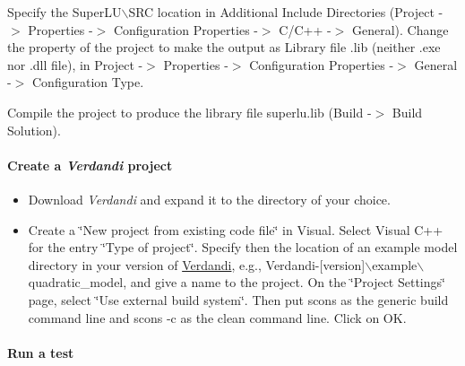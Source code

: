 \documentclass{tufte-book}
\begin{document}
\begin{itemize}
\-Specify the {\ttfamily \-Super\-L\-U$\backslash$\-S\-R\-C} location in {\ttfamily \-Additional \-Include \-Directories} (\-Project -\/$>$ \-Properties -\/$>$ \-Configuration \-Properties -\/$>$ \-C/\-C++ -\/$>$ \-General). \-Change the property of the project to make the output as \-Library file {\ttfamily .lib} (neither {\ttfamily .exe} nor {\ttfamily .dll} file), in \-Project -\/$>$ \-Properties -\/$>$ \-Configuration \-Properties -\/$>$ \-General -\/$>$ \-Configuration \-Type. \par


\-Compile the project to produce the library file {\ttfamily superlu.\-lib} (\-Build -\/$>$ \-Build \-Solution).


\end{itemize}\hypertarget{installation_project}{}\paragraph{\-Create a \emph{Verdandi} project}\label{installation_project}

\begin{itemize}
\item \-Download \-\emph{Verdandi} and expand it to the directory of your choice.


\item \-Create a \char`\"{}\-New project from existing code file\char`\"{} in \-Visual. \-Select \-Visual \-C++ for the entry \char`\"{}\-Type of project\char`\"{}. \-Specify then the location of an example model directory in your version of \hyperlink{namespace_verdandi}{\-Verdandi}, e.\-g., {\ttfamily \-Verdandi-\/\mbox{[}version\mbox{]}$\backslash$example$\backslash$quadratic\-\_\-model}, and give a name to the project. \-On the \char`\"{}\-Project Settings\char`\"{} page, select \char`\"{}\-Use external build system\char`\"{}. \-Then put {\ttfamily scons} as the generic build command line and {\ttfamily scons -\/c} as the clean command line. \-Click on \-O\-K.
\end{itemize}

\hypertarget{installation_test}{}\paragraph{\-Run a test}\label{installation_test}
\end{document}
